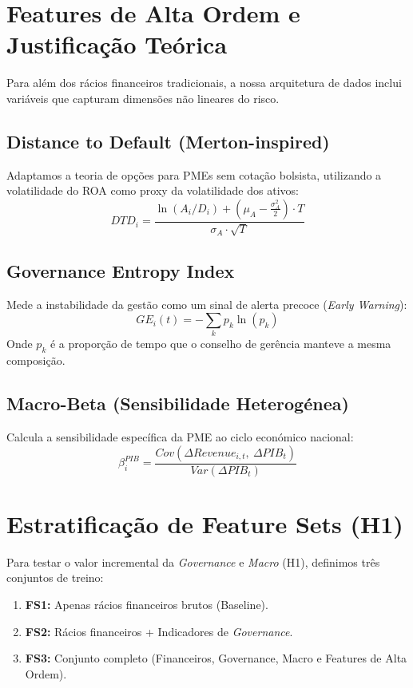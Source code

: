\section{Features de Alta Ordem e Justificação Teórica}

Para além dos rácios financeiros tradicionais, a nossa arquitetura de dados inclui variáveis que capturam dimensões não lineares do risco.

\subsection{Distance to Default (Merton-inspired)}
Adaptamos a teoria de opções para PMEs sem cotação bolsista, utilizando a volatilidade do ROA como proxy da volatilidade dos ativos:
\begin{equation}
    DTD_i = \frac{\ln(A_i / D_i) + (\mu_A - \frac{\sigma_A^2}{2}) \cdot T}{\sigma_A \cdot \sqrt{T}}
\end{equation}

\subsection{Governance Entropy Index}
Mede a instabilidade da gestão como um sinal de alerta precoce (\textit{Early Warning}):
\begin{equation}
    GE_i(t) = -\sum_{k} p_k \ln(p_k)
\end{equation}
Onde $p_k$ é a proporção de tempo que o conselho de gerência manteve a mesma composição.

\subsection{Macro-Beta (Sensibilidade Heterogénea)}
Calcula a sensibilidade específica da PME ao ciclo económico nacional:
\begin{equation}
    \beta^{PIB}_{i} = \frac{Cov(\Delta Revenue_{i,t},\ \Delta PIB_t)}{Var(\Delta PIB_t)}
\end{equation}

\section{Estratificação de Feature Sets (H1)}

Para testar o valor incremental da \textit{Governance} e \textit{Macro} (H1), definimos três conjuntos de treino:
\begin{enumerate}
    \item \textbf{FS1:} Apenas rácios financeiros brutos (Baseline).
    \item \textbf{FS2:} Rácios financeiros + Indicadores de \textit{Governance}.
    \item \textbf{FS3:} Conjunto completo (Financeiros, Governance, Macro e Features de Alta Ordem).
\end{enumerate}

